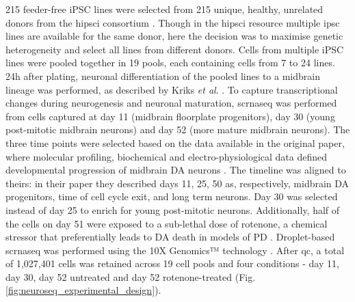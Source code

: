 215 feeder-free iPSC lines 
were selected
from 215 unique, healthy, unrelated donors from the \gls{hipsci} consortium \cite{kilpinen2017common}.
Though in the \gls{hipsci} resource multiple \gls{ipsc} lines are available for the same donor, here 
the decision was
to maximise genetic heterogeneity and select all lines from different donors.
Cells from multiple iPSC lines were pooled together in 19 pools, each containing cells from 7 to 24 lines.
24h after plating, neuronal differentiation of the pooled lines to a midbrain lineage was performed, as described by Kriks \textit{et al}. \cite{kriks2011dopamine}. 
To capture transcriptional changes during neurogenesis and neuronal maturation, 
\gls{scrnaseq} 
was performed
from cells captured at day 11 (midbrain floorplate progenitors), day 30 (young post-mitotic midbrain neurons) and day 52 (more mature midbrain neurons). 
The
three time points 
were selected based on the data available in the original paper, where molecular profiling, biochemical and electro-physiological data defined developmental progression of midbrain DA neurons \cite{kriks2011dopamine}. 
The timeline was aligned to theirs:
in their paper they described days 11, 25, 50
as, respectively, midbrain DA progenitors, time of cell cycle exit, 
and
long term neurons.
Day 30 was selected instead of day 25 to enrich for young post-mitotic neurons. 
Additionally, 
half of the cells on day 51 
were exposed
to a sub-lethal dose of rotenone, a chemical stressor that preferentially leads to DA death in models of PD \cite{xiong2012mitochondrial}.
Droplet-based \gls{scrnaseq} was performed using the 10X Genomics™ technology \cite{zheng2017massively}.
After \gls{qc}, 
a total of 1,027,401 cells
was retained
across 19 cell pools and four conditions - day 11, day 30, day 52 untreated and day 52 rotenone-treated (Fig. \ref{fig:neuroseq_experimental_design}).

